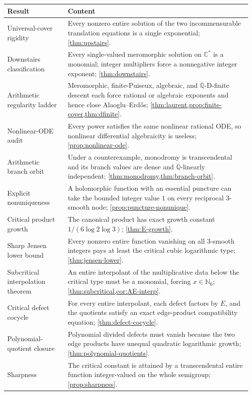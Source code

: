 \documentclass[11pt,oneside]{article}
\theoremstyle{definition}
\theoremstyle{remark}
\newcommand{\Nzero}{\mathbb N_0}
\newcommand{\C}{\mathbb C}
\newcommand{\Qbar}{\overline{\mathbb Q}}
\newcommand{\AEconj}{Alaoglu--Erd\H{o}s}
\begin{document}
\begin{longtable}{>{\raggedright\arraybackslash}p{} >{\raggedright\arraybackslash}p{}}
\toprule
\textbf{Result} & \textbf{Content}\\
\midrule
\endhead
Universal-cover rigidity & Every nonzero entire solution of the two incommensurable translation equations is a single exponential; \cref{thm:upstairs}.\\
Downstairs classification & Every single-valued meromorphic solution on \(\C^*\) is a monomial; integer multipliers force a nonnegative integer exponent; \cref{thm:downstairs}.\\
Arithmetic regularity ladder & Meromorphic, finite-Puiseux, algebraic, and \(\Qbar\)-D-finite descent each force rational or algebraic exponents and hence close \AEconj; \cref{thm:laurent,prop:finite-cover,thm:dfinite}.\\
Nonlinear-ODE audit & Every power satisfies the same nonlinear rational ODE, so nonlinear differential algebraicity is useless; \cref{prop:nonlinear-ode}.\\
Arithmetic branch orbit & Under a counterexample, monodromy is transcendental and its branch values are dense and \(\Qbar\)-linearly independent; \cref{thm:monodromy,thm:branch-orbit}.\\
Explicit nonuniqueness & A holomorphic function with an essential puncture can take the bounded integer value \(1\) on every reciprocal \(3\)-smooth node; \cref{prop:puncture-nonunique}.\\
Critical product growth & The canonical product has exact growth constant \(1/(6\log2\log3)\); \cref{thm:E-growth}.\\
Sharp Jensen lower bound & Every nonzero entire function vanishing on all \(3\)-smooth integers pays at least the critical cubic logarithmic type; \cref{thm:jensen-lower}.\\
Subcritical interpolation theorem & An entire interpolant of the multiplicative data below the critical type must be a monomial, forcing \(x\in\Nzero\); \cref{thm:subcritical,cor:AE-interp}.\\
Critical defect cocycle & For every entire interpolant, each defect factors by \(E\), and the quotients satisfy an exact edge-product compatibility equation; \cref{thm:defect-cocycle}.\\
Polynomial-quotient closure & Polynomial divided defects must vanish because the two edge products have unequal quadratic logarithmic growth; \cref{thm:polynomial-quotients}.\\
Sharpness & The critical constant is attained by a transcendental entire function integer-valued on the whole semigroup; \cref{prop:sharpness}.\\
\bottomrule
\end{longtable}
\end{document}
